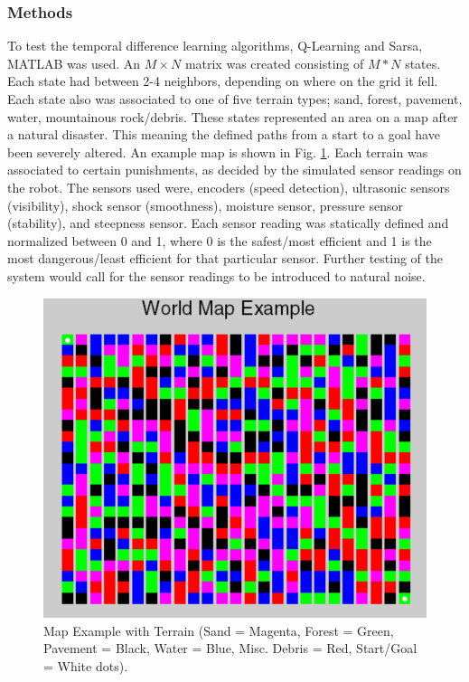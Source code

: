 \documentclass[12pt,american]{report}
\begin{document}
\subsubsection{Methods}

To test the temporal difference learning algorithms, Q-Learning and Sarsa, MATLAB was used. An $M\times N$ matrix was created consisting of $M*N$ states.  Each state had between 2-4 neighbors, depending on where on the grid it fell.  Each state also was associated to one of five terrain types; sand, forest, pavement, water, mountainous rock/debris.  These states represented an area on a map after a natural disaster.  This meaning the defined paths from a start to a goal have been severely altered. An example map is shown in Fig. \ref{fig:map-example}. Each terrain was associated to certain punishments, as decided by the simulated sensor readings on the robot.  The sensors used were, encoders (speed detection), ultrasonic sensors (visibility), shock sensor (smoothness), moisture sensor, pressure sensor (stability), and steepness sensor.  Each sensor reading was statically defined and normalized between 0 and 1, where 0 is the safest/most efficient and 1 is the most dangerous/least efficient for that particular sensor. Further testing of the system would call for the sensor readings to be introduced to natural noise.

\begin{figure}
\centering
\includegraphics[scale=.75]{images/map-example.PNG}
\caption{Map Example with Terrain (Sand = Magenta, Forest = Green, Pavement = Black, Water = Blue, Misc. Debris = Red, Start/Goal = White dots).}
\label{fig:map-example}
\end{figure}
\end{document}
